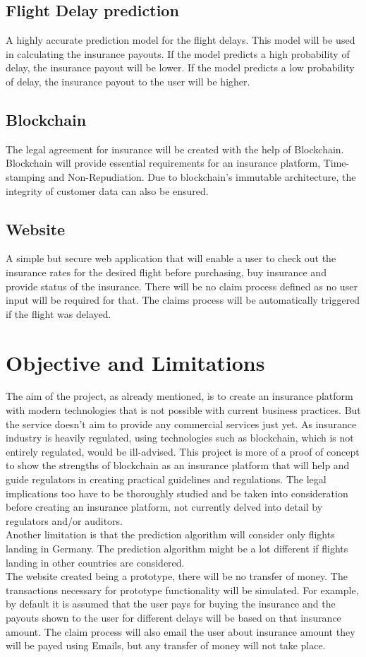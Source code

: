     \subsection{Flight Delay prediction}
    A highly accurate prediction model for the flight delays. This model will be used in calculating the insurance payouts. If the model predicts a high probability of delay, the insurance payout will be lower. If the model predicts a low probability of delay, the insurance payout to the user will be higher.
    \subsection{Blockchain}
    The legal agreement for insurance will be created with the help of Blockchain. Blockchain will provide essential requirements for an insurance platform, Time-stamping and Non-Repudiation. Due to blockchain's immutable architecture, the integrity of customer data can also be ensured.
    \subsection{Website}
    A simple but secure web application that will enable a user to check out the insurance rates for the desired flight before purchasing, buy insurance and provide status of the insurance. There will be no claim process defined as no user input will be required for that. The claims process will be automatically triggered if the flight was delayed.

\section{Objective and Limitations}
The aim of the project, as already mentioned, is to create an insurance platform with modern technologies that is not possible with current business practices. But the service doesn't aim to provide any commercial services just yet. As insurance industry is heavily regulated, using technologies such as blockchain, which is not entirely regulated, would be ill-advised. This project is more of a proof of concept to show the strengths of blockchain as an insurance platform that will help and guide regulators in creating practical guidelines and regulations. The legal implications too have to be thoroughly studied and be taken into consideration before creating an insurance platform, not currently delved into detail by regulators and/or auditors.
\\Another limitation is that the prediction algorithm will consider only flights landing in Germany. The prediction algorithm might be a lot different if flights landing in other countries are considered.
\\The website created being a prototype, there will be no transfer of money. The transactions necessary for prototype functionality will be simulated. For example, by default it is assumed that the user pays  for buying the insurance and the payouts shown to the user for different delays will be based on that insurance amount. The claim process will also email the user about insurance amount they will be payed using Emails, but any transfer of money will not take place.